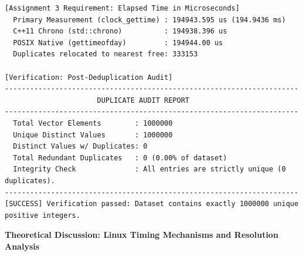 \documentclass[12pt]{article}
\begin{document}
\begin{lstlisting}
[Assignment 3 Requirement: Elapsed Time in Microseconds]
  Primary Measurement (clock_gettime) : 194943.595 us (194.9436 ms)
  C++11 Chrono (std::chrono)          : 194938.396 us
  POSIX Native (gettimeofday)         : 194944.00 us
  Duplicates relocated to nearest free: 333153

[Verification: Post-Deduplication Audit]
----------------------------------------------------------------------
                      DUPLICATE AUDIT REPORT                          
----------------------------------------------------------------------
  Total Vector Elements        : 1000000
  Unique Distinct Values       : 1000000
  Distinct Values w/ Duplicates: 0
  Total Redundant Duplicates   : 0 (0.00% of dataset)
  Integrity Check              : All entries are strictly unique (0 duplicates).
----------------------------------------------------------------------
[SUCCESS] Verification passed: Dataset contains exactly 1000000 unique positive integers.
\end{lstlisting}

\newpage

\textbf{Theoretical Discussion: Linux Timing Mechanisms and Resolution Analysis}

\begin{table}[H]
\centering
{}
\caption{Comprehensive taxonomy of Linux software timing mechanisms.}
\end{table}
\end{document}
